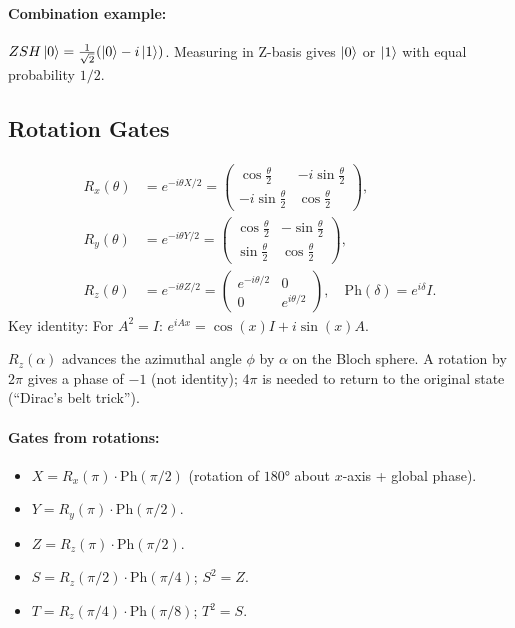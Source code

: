 \documentclass[10pt,a4paper]{article}
\begin{document}
\paragraph{Combination example:} $ZSH\ket{0}=\frac{1}{\sqrt{2}}(\ket{0}-i\ket{1})$. Measuring in Z-basis gives $\ket{0}$ or $\ket{1}$ with equal probability $1/2$.

\subsection{Rotation Gates}

\begin{tcolorbox}[defstyle, title={Definition: Rotation Gates}]
\begin{align*}
R_x(\theta) &= e^{-i\theta X/2} = \begin{pmatrix}\cos\frac{\theta}{2}&-i\sin\frac{\theta}{2}\\-i\sin\frac{\theta}{2}&\cos\frac{\theta}{2}\end{pmatrix}, \\
R_y(\theta) &= e^{-i\theta Y/2} = \begin{pmatrix}\cos\frac{\theta}{2}&-\sin\frac{\theta}{2}\\\sin\frac{\theta}{2}&\cos\frac{\theta}{2}\end{pmatrix}, \\
R_z(\theta) &= e^{-i\theta Z/2} = \begin{pmatrix}e^{-i\theta/2}&0\\0&e^{i\theta/2}\end{pmatrix},\quad \mathrm{Ph}(\delta)=e^{i\delta}I.
\end{align*}
Key identity: For $A^2=I$: $e^{iAx}=\cos(x)I+i\sin(x)A$.
\end{tcolorbox}

$R_z(\alpha)$ advances the azimuthal angle $\phi$ by $\alpha$ on the Bloch sphere. A rotation by $2\pi$ gives a phase of $-1$ (not identity); $4\pi$ is needed to return to the original state (``Dirac's belt trick'').

\paragraph{Gates from rotations:}
\begin{itemize}[nosep]
\item $X = R_x(\pi)\cdot\mathrm{Ph}(\pi/2)$ (rotation of $180°$ about $x$-axis + global phase).
\item $Y = R_y(\pi)\cdot\mathrm{Ph}(\pi/2)$.
\item $Z = R_z(\pi)\cdot\mathrm{Ph}(\pi/2)$.
\item $S = R_z(\pi/2)\cdot\mathrm{Ph}(\pi/4)$; $S^2=Z$.
\item $T = R_z(\pi/4)\cdot\mathrm{Ph}(\pi/8)$; $T^2=S$.
\end{itemize}
\end{document}

